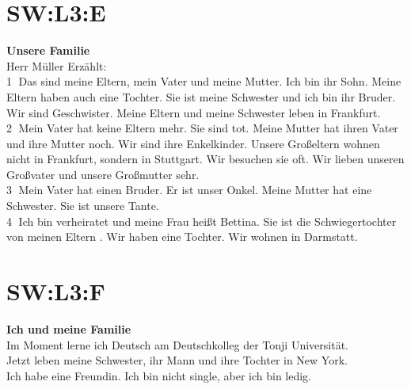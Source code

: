 \section{SW:L3:E}
\textbf{Unsere Familie} \\
Herr Müller Erzählt: \\
\textcircled{1} Das sind meine Eltern, mein Vater und meine Mutter. Ich bin ihr Sohn. Meine Eltern haben auch eine Tochter. Sie ist meine Schwester und ich bin ihr Bruder. Wir sind Geschwister. Meine Eltern und meine Schwester leben in Frankfurt. \\
\textcircled{2} Mein Vater hat keine Eltern mehr. Sie sind tot. Meine Mutter hat ihren Vater und ihre Mutter noch. Wir sind ihre Enkelkinder. Unsere Großeltern wohnen nicht in Frankfurt, sondern in Stuttgart. Wir besuchen sie oft. Wir lieben unseren Großvater und unsere Großmutter sehr. \\
\textcircled{3} Mein Vater hat einen Bruder. Er ist unser Onkel. Meine Mutter hat eine Schwester. Sie ist unsere Tante. \\
\textcircled{4} Ich bin verheiratet und meine Frau heißt Bettina. Sie ist die Schwiegertochter von meinen Eltern . Wir haben eine Tochter. Wir wohnen in Darmstatt. \\

\section{SW:L3:F}
\textbf{Ich und meine Familie} \\
Im Moment lerne ich Deutsch am Deutschkolleg der Tonji Universität.  \\
Jetzt leben meine Schwester, ihr Mann und ihre Tochter in New York. \\
Ich habe eine Freundin. Ich bin nicht single, aber ich bin ledig.  \\

